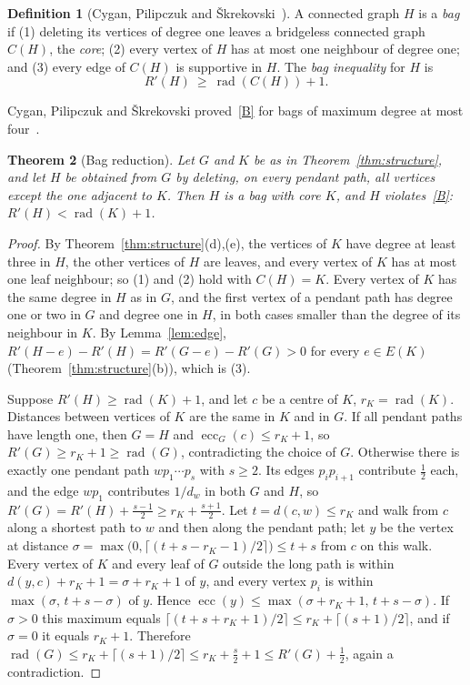 \documentclass[11pt]{amsart}
\newtheorem{theorem}{Theorem}[section]
\theoremstyle{definition}
\newtheorem{definition}[theorem]{Definition}
\DeclareMathOperator{\rad}{rad}
\DeclareMathOperator{\ecc}{ecc}
\newcommand{\Rp}{R'}
\begin{document}
\begin{definition}[Cygan, Pilipczuk and \v{S}krekovski~\cite{CPS}]\label{def:bag}
A connected graph $H$ is a \emph{bag} if (1) deleting its vertices of degree one leaves a bridgeless connected graph
$C(H)$, the \emph{core}; (2) every vertex of $H$ has at most one neighbour of degree one; and (3) every edge of
$C(H)$ is supportive in $H$. The \emph{bag inequality} for $H$ is
\begin{equation}\label{B}\tag{B}
\Rp(H)\ \ge\ \rad(C(H))+1 .
\end{equation}
\end{definition}

Cygan, Pilipczuk and \v{S}krekovski proved~\eqref{B} for bags of maximum degree at most four~\cite[Proposition 4.3]{CPS}.

\begin{theorem}[Bag reduction]\label{thm:bagred}
Let $G$ and $K$ be as in Theorem~\ref{thm:structure}, and let $H$ be obtained from $G$ by deleting, on every pendant path,
all vertices except the one adjacent to $K$. Then $H$ is a bag with core $K$, and $H$ violates~\eqref{B}:
$\Rp(H)<\rad(K)+1$.
\end{theorem}

\begin{proof}
By Theorem~\ref{thm:structure}(d),(e), the vertices of $K$ have degree at least three in $H$, the other vertices of $H$
are leaves, and every vertex of $K$ has at most one leaf neighbour; so (1) and (2) hold with $C(H)=K$. Every vertex of $K$
has the same degree in $H$ as in $G$, and the first vertex of a pendant path has degree one or two in $G$ and degree one in
$H$, in both cases smaller than the degree of its neighbour in $K$. By Lemma~\ref{lem:edge}, $\Rp(H-e)-\Rp(H)=
\Rp(G-e)-\Rp(G)>0$ for every $e\in E(K)$ (Theorem~\ref{thm:structure}(b)), which is (3).

Suppose $\Rp(H)\ge\rad(K)+1$, and let $c$ be a centre of $K$, $r_K=\rad(K)$. Distances between vertices of $K$ are the same
in $K$ and in $G$. If all pendant paths have length one, then $G=H$ and $\ecc_G(c)\le r_K+1$, so
$\Rp(G)\ge r_K+1\ge\rad(G)$, contradicting the choice of $G$. Otherwise there is exactly one pendant path
$w p_1\cdots p_s$ with $s\ge2$. Its edges $p_ip_{i+1}$ contribute $\frac12$ each, and the edge $wp_1$ contributes
$1/d_w$ in both $G$ and $H$, so $\Rp(G)=\Rp(H)+\frac{s-1}2\ge r_K+\frac{s+1}2$. Let $t=d(c,w)\le r_K$ and walk from $c$
along a shortest path to $w$ and then along the pendant path; let $y$ be the vertex at distance
$\sigma=\max\bigl(0,\lceil (t+s-r_K-1)/2\rceil\bigr)\le t+s$ from $c$ on this walk. Every vertex of $K$ and every leaf
of $G$ outside the long path is within $d(y,c)+r_K+1=\sigma+r_K+1$ of $y$, and every vertex $p_i$ is within
$\max(\sigma,\,t+s-\sigma)$ of $y$. Hence $\ecc(y)\le\max(\sigma+r_K+1,\,t+s-\sigma)$. If $\sigma>0$ this maximum equals
$\lceil (t+s+r_K+1)/2\rceil\le r_K+\lceil (s+1)/2\rceil$, and if $\sigma=0$ it equals $r_K+1$. Therefore
$\rad(G)\le r_K+\lceil (s+1)/2\rceil\le r_K+\frac s2+1\le\Rp(G)+\frac12$, again a contradiction.
\end{proof}
\end{document}
